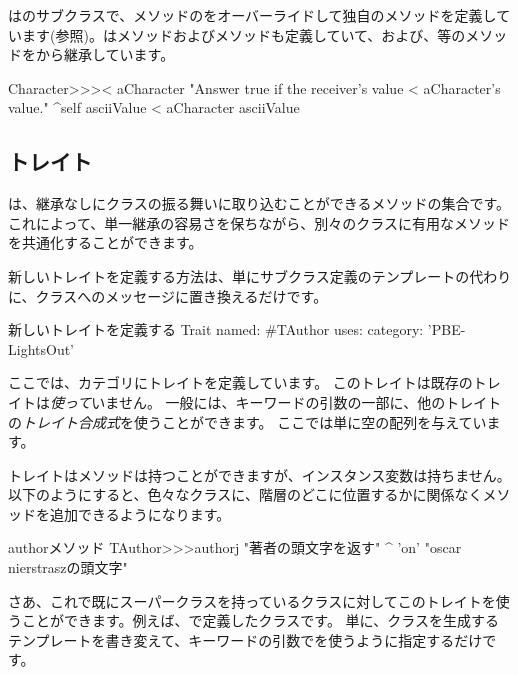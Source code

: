 \documentclass[a4paper,10pt,twoside]{book}
\begin{document}
はのサブクラスで、\ct{<}メソッドのをオーバーライドして独自のメソッドを定義しています(参照)。は\ct{=}メソッドおよびメソッドも定義していて、\ct{>=}および\ct{<=}、\ct{~=}等のメソッドをから継承しています。

\begin{method}[CharacterLessThan]{}
Character>>>< aCharacter 
	"Answer true if the receiver's value < aCharacter's value."
	^self asciiValue < aCharacter asciiValue
\end{method}

\subsection{トレイト}
は、継承なしにクラスの振る舞いに取り込むことができるメソッドの集合です。
これによって、単一継承の容易さを保ちながら、別々のクラスに有用なメソッドを共通化することができます。

新しいトレイトを定義する方法は、単にサブクラス定義のテンプレートの代わりに、クラスへのメッセージに置き換えるだけです。

\begin{classdef}[tauthor]{新しいトレイトを定義する}
Trait named: #TAuthor
	uses: { }
	category: 'PBE-LightsOut'
\end{classdef}

\noindent
ここでは、カテゴリにトレイトを定義しています。
このトレイトは既存のトレイトは\emph{使って}いません。
一般には、キーワードの引数の一部に、他のトレイトの\emph{トレイト合成式}を使うことができます。
ここでは単に空の配列を与えています。

トレイトはメソッドは持つことができますが、インスタンス変数は持ちません。
以下のようにすると、色々なクラスに、階層のどこに位置するかに関係なくメソッドを追加できるようになります。

\begin{method}[author]{authorメソッド}
TAuthor>>>authorj
    "著者の頭文字を返す"
	^ 'on'    "oscar nierstraszの頭文字"
\end{method}

\noindent
さあ、これで既にスーパークラスを持っているクラスに対してこのトレイトを使うことができます。例えば、で定義したクラスです。
単に、クラスを生成するテンプレートを書き変えて、キーワードの引数でを使うように指定するだけです。
\end{document}

